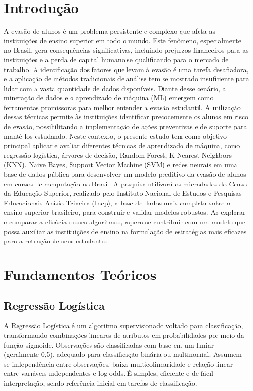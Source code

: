 \documentclass[english, spanish, brazilian]{RBIEarticle} %
\begin{document}
\section{Introdução}
A evasão de alunos é um problema persistente e complexo que afeta as instituições de ensino superior em todo o mundo. Este fenômeno, especialmente no Brasil, gera consequências significativas, incluindo prejuízos financeiros para as instituições e a perda de capital humano se qualificando para o mercado de trabalho. A identificação dos fatores que levam à evasão é uma tarefa desafiadora, e a aplicação de métodos tradicionais de análise tem se mostrado insuficiente para lidar com a vasta quantidade de dados disponíveis.
Diante desse cenário, a mineração de dados e o aprendizado de máquina (ML) emergem como ferramentas promissoras para melhor entender a evasão estudantil. A utilização dessas técnicas permite às instituições identificar precocemente os alunos em risco de evasão, possibilitando a implementação de ações preventivas e de suporte para mantê-los estudando.
Neste contexto, o presente estudo tem como objetivo principal aplicar e avaliar diferentes técnicas de aprendizado de máquina, como regressão logística, árvores de decisão, Random Forest, K-Nearest Neighbors (KNN), Naive Bayes, Support Vector Machine (SVM) e redes neurais em uma base de dados pública para desenvolver um modelo preditivo da evasão de alunos em cursos de computação no Brasil. A pesquisa utilizará os microdados do Censo da Educação Superior, realizado pelo Instituto Nacional de Estudos e Pesquisas Educacionais Anísio Teixeira (Inep), a base de dados mais completa sobre o ensino superior brasileiro, para construir e validar modelos robustos. Ao explorar e comparar a eficácia desses algoritmos, espera-se contribuir com um modelo que possa auxiliar as instituições de ensino na formulação de estratégias mais eficazes para a retenção de seus estudantes.



\section{Fundamentos Teóricos}

\subsection{Regressão Logística}
A Regressão Logística é um algoritmo supervisionado voltado para classificação, transformando combinações lineares de atributos em probabilidades por meio da função sigmoide. Observações são classificadas com base em um limiar (geralmente 0,5), adequado para classificação binária ou multinomial. Assumem-se independência entre observações, baixa multicolinearidade e relação linear entre variáveis independentes e log-odds. É simples, eficiente e de fácil interpretação, sendo referência inicial em tarefas de classificação.
\end{document}
